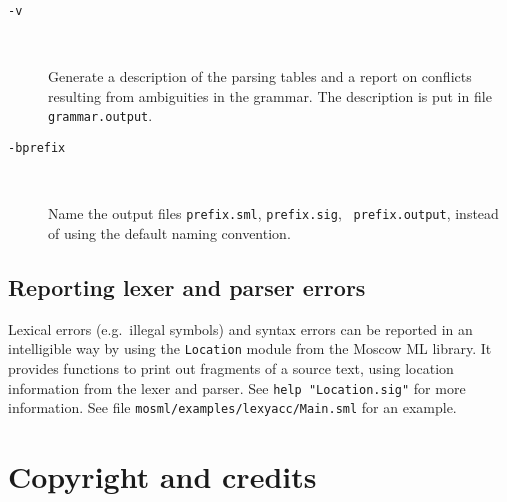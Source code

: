 \documentclass[fleqn]{article}
\begin{document}
\begin{description}
\item[{\tt -v}]\mbox{ }

  Generate a description of the parsing tables and a report on
  conflicts resulting from ambiguities in the grammar.  The
  description is put in file {\tt grammar.output}.

\item[{\tt -b{\rm prefix}}]\mbox{ }

  Name the output files {\tt prefix.sml}, {\tt prefix.sig}, {\tt
    prefix.output}, instead of using the default naming convention.
\end{description}


\subsection{Reporting lexer and parser errors}

Lexical errors (e.g.\ illegal symbols) and syntax errors can be
reported in an intelligible way by using the {\tt Location} module
from the Moscow ML library.  It provides functions to print out
fragments of a source text, using location information from the lexer
and parser.  See {\tt help "Location.sig"} for more information.  See
file {\tt mosml/examples/lexyacc/Main.sml} for an example.

\newpage

\section{Copyright and credits}
\label{sec-copyright}
\end{document}
